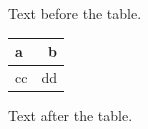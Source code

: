 \documentclass[12pt]{article}
\begin{document}
Text before the table.

\begin{tabular}{||l|r||}\hline\hline a & b\\\hline\hline cc & dd\\\hline\end{tabular}

Text after the table.
\end{document}
